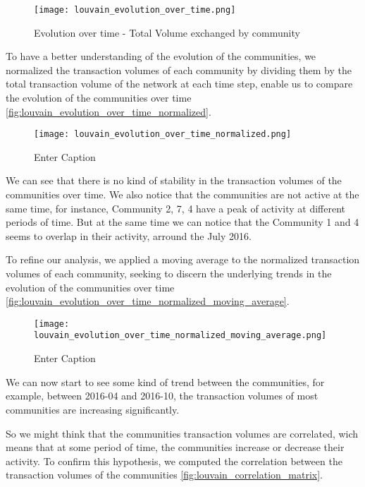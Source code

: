 \documentclass[a4paper, 12pt]{article}
\begin{document}
\begin{figure}[h]
    \centering
    \texttt{[image: louvain\_evolution\_over\_time.png]}
    \caption{Evolution over time - Total Volume exchanged by community}
    \label{fig:louvain_evolution_over_time}
\end{figure}

To have a better understanding of the evolution of the communities, we normalized the transaction volumes of each community by dividing them by the total transaction volume of the network at each time step,
enable us to compare the evolution of the communities over time \ref{fig:louvain_evolution_over_time_normalized}.

\begin{figure}[h]
    \centering
    \texttt{[image: louvain\_evolution\_over\_time\_normalized.png]}
    \caption{Enter Caption}
    \label{fig:enter-label}
\end{figure}

We can see that there is no kind of stability in the transaction volumes of the communities over time. We also notice that the communities are 
not active at the same time, for instance, Community 2, 7, 4 have a peak of activity at different periods of time.
But at the same time we can notice that the Community 1 and 4 seems to overlap in their activity, arround the July 2016.

To refine our analysis, we applied a moving average to the normalized transaction volumes of each community, 
seeking to discern the underlying trends in the evolution of the communities over time \ref{fig:louvain_evolution_over_time_normalized_moving_average}.

\begin{figure}[h]
    \centering
    \texttt{[image: louvain\_evolution\_over\_time\_normalized\_moving\_average.png]}
    \caption{Enter Caption}
    \label{fig:enter-label}
\end{figure}

We can now start to see some kind of trend between the communities, for example, between 2016-04 and 2016-10, the transaction volumes
of most communities are increasing significantly.

So we might think that the communities transaction volumes are correlated, wich means that at some period of time, 
the communities increase or decrease their activity. 
To confirm this hypothesis, we computed the correlation between the transaction volumes of the communities \ref{fig:louvain_correlation_matrix}.
\end{document}

